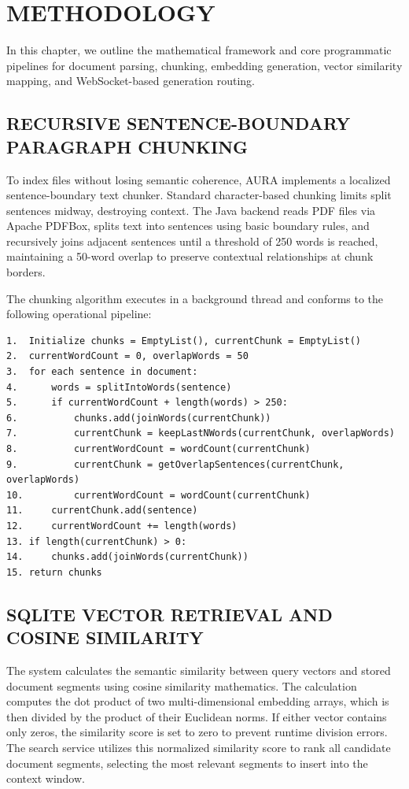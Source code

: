 \documentclass[12pt,a4paper]{report}
\begin{document}
\chapter{METHODOLOGY}
\label{ch:methodology}

In this chapter, we outline the mathematical framework and core programmatic pipelines for document parsing, chunking, embedding generation, vector similarity mapping, and WebSocket-based generation routing.

\section{RECURSIVE SENTENCE-BOUNDARY PARAGRAPH CHUNKING}
To index files without losing semantic coherence, AURA implements a localized sentence-boundary text chunker. Standard character-based chunking limits split sentences midway, destroying context. The Java backend reads PDF files via Apache PDFBox, splits text into sentences using basic boundary rules, and recursively joins adjacent sentences until a threshold of 250 words is reached, maintaining a 50-word overlap to preserve contextual relationships at chunk borders.

The chunking algorithm executes in a background thread and conforms to the following operational pipeline:

\begin{singlespace}
\footnotesize
\begin{verbatim}
1.  Initialize chunks = EmptyList(), currentChunk = EmptyList()
2.  currentWordCount = 0, overlapWords = 50
3.  for each sentence in document:
4.      words = splitIntoWords(sentence)
5.      if currentWordCount + length(words) > 250:
6.          chunks.add(joinWords(currentChunk))
7.          currentChunk = keepLastNWords(currentChunk, overlapWords)
8.          currentWordCount = wordCount(currentChunk)
9.          currentChunk = getOverlapSentences(currentChunk, overlapWords)
10.         currentWordCount = wordCount(currentChunk)
11.     currentChunk.add(sentence)
12.     currentWordCount += length(words)
13. if length(currentChunk) > 0:
14.     chunks.add(joinWords(currentChunk))
15. return chunks
\end{verbatim}
\end{singlespace}

\section{SQLITE VECTOR RETRIEVAL AND COSINE SIMILARITY}
The system calculates the semantic similarity between query vectors and stored document segments using cosine similarity mathematics. The calculation computes the dot product of two multi-dimensional embedding arrays, which is then divided by the product of their Euclidean norms. If either vector contains only zeros, the similarity score is set to zero to prevent runtime division errors. The search service utilizes this normalized similarity score to rank all candidate document segments, selecting the most relevant segments to insert into the context window.
\end{document}
